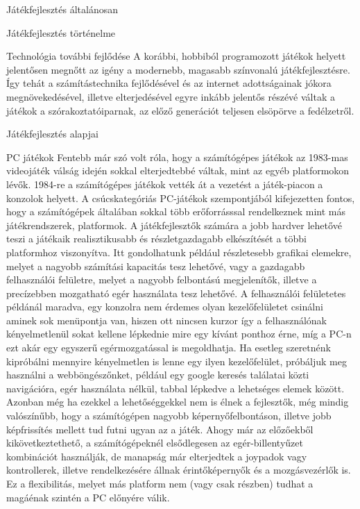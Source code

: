 \begin{MyChapter}{Játékfejlesztés általánosan}
\begin{MySection}{Játékfejlesztés történelme}
\begin{MySubSection}{Technológia további fejlődése}
			A korábbi, hobbiból programozott játékok helyett jelentősen megnőtt az igény a modernebb, magasabb színvonalú játékfejlesztésre. 
			Így tehát a számítástechnika fejlődésével és az internet adottságainak jókora megnövekedésével, illetve elterjedésével egyre inkább jelentős részévé váltak a játékok a szórakoztatóiparnak, az előző generációt teljesen elsöpörve a fedélzetről.
		\end{MySubSection}
				
	\end{MySection}

	\begin{MySection}{Játékfejlesztés alapjai} 
		
		\begin{MySubSection}{PC játékok}
			Fentebb már szó volt róla, hogy a számítógépes játékok az 1983-mas videojáték válság idején sokkal elterjedtebbé váltak, mint az egyéb platformokon lévők. 1984-re a számítógépes játékok vették át a vezetést a játék-piacon a konzolok helyett.
			A csúcskategóriás PC-játékok szempontjából kifejezetten fontos, hogy a számítógépek általában sokkal több erőforrásssal rendelkeznek mint más játékrendszerek, platformok. A játékfejlesztők számára a jobb hardver lehetővé teszi a játékaik realisztikusabb és részletgazdagabb elkészítését a többi platformhoz viszonyítva. Itt gondolhatunk például részletesebb grafikai elemekre, melyet a nagyobb számítási kapacitás tesz lehetővé, vagy a gazdagabb felhasználói felületre, melyet a nagyobb felbontású megjelenítők, illetve a precízebben mozgatható egér használata tesz lehetővé. A felhasználói felületetes példánál maradva, egy konzolra nem érdemes olyan kezelőfelületet csinálni aminek sok menüpontja van, hiszen ott nincsen kurzor így a felhasználónak kényelmetlenül sokat kellene lépkednie mire egy kívánt ponthoz érne, míg a PC-n ezt akár egy egyszerű egérmozgatással is megoldhatja.
			Ha esetleg szeretnénk kipróbálni mennyire kényelmetlen is lenne egy ilyen kezelőfelület, próbáljuk meg használni a webböngészőnket, például egy google keresés találatai közti navigációra, egér használata nélkül, tabbal lépkedve a lehetséges elemek között.
			Azonban még ha ezekkel a lehetőséggekkel nem is élnek a fejlesztők, még mindig valószínűbb, hogy a számítógépen nagyobb képernyőfelbontáson, illetve jobb képfrissítés mellett tud futni ugyan az a játék.
			Ahogy már az előzőekből kikövetkeztethető, a számítógépeknél elsődlegesen az egér-billentyűzet kombinációt használják, de manapság már elterjedtek a joypadok vagy kontrollerek, illetve rendelkezésére állnak érintőképernyők és a mozgásvezérlők is. Ez a flexibilitás, melyet más platform nem (vagy csak részben) tudhat a magáénak szintén a PC előnyére válik. 
		\end{MySubSection}
	

\end{MySection}
\end{MyChapter}
